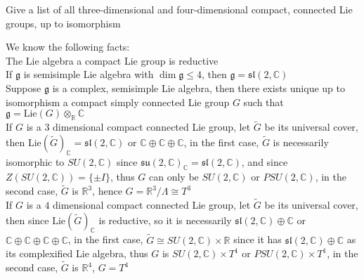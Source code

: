\documentclass[main]{subfiles}
\begin{document}
\begin{exercise}
Give a list of all three-dimensional and four-dimensional compact, connected Lie groups, up to isomorphism
\end{exercise}

\begin{solution}
We know the following facts: \\
The Lie algebra a compact Lie group is reductive \\
If $\mathfrak{g}$ is semisimple Lie algebra with $\dim\mathfrak{g}\leq4$, then $\mathfrak{g}=\mathfrak{sl}(2,\mathbb C)$ \\
Suppose $\mathfrak{g}$ is a complex, semisimple Lie algebra, then there exists unique up to isomorphism a compact simply connected Lie group $G$ such that $\mathfrak{g}=\displaystyle\mathrm{Lie}(G)\otimes_\mathbb R\mathbb C$ \\
If $G$ is a $3$ dimensional compact connected Lie group, let $\tilde{G}$ be its universal cover, then $\mathrm{Lie}(\tilde G)_{\mathbb C}=\mathfrak{sl}(2,\mathbb C)$ or $\mathbb C\oplus\mathbb C\oplus\mathbb C$, in the first case, $\tilde G$ is necessarily isomorphic to $SU(2,\mathbb C)$ since $\mathfrak{su}(2,\mathbb C)_\mathbb C=\mathfrak{sl}(2,\mathbb C)$, and since $Z(SU(2,\mathbb C))=\{\pm I\}$, thus $G$ can only be $SU(2,\mathbb C)$ or $PSU(2,\mathbb C)$, in the second case, $\tilde G$ is $\mathbb R^3$, hence $G=\mathbb R^3/\Lambda\cong T^3$ \\
If $G$ is a $4$ dimensional compact connected Lie group, let $\tilde{G}$ be its universal cover, then since $\mathrm{Lie}(\tilde G)_{\mathbb C}$ is reductive, so it is necessarily $\mathfrak{sl}(2,\mathbb C)\oplus\mathbb C$ or $\mathbb C\oplus\mathbb C\oplus\mathbb C\oplus\mathbb C$, in the first case, $\tilde G\cong SU(2,\mathbb C)\times\mathbb R$ since it has $\mathfrak{sl}(2,\mathbb C)\oplus\mathbb C$ as its complexified Lie algebra, thus $G$ is $SU(2,\mathbb C)\times T^1$ or $PSU(2,\mathbb C)\times T^1$, in the second case, $\tilde G$ is $\mathbb R^4$, $G=T^4$
\end{solution}

\begin{exercise}
\begin{enumerate}[label=(\alph*),leftmargin=*]

\end{enumerate}
\end{exercise}
\end{document}
